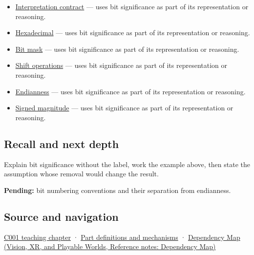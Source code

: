 \begin{itemize}
\tightlist
\item
  \hyperref[appendix-f414bd4ed05c]{Interpretation contract} --- uses bit significance as part of its representation or reasoning.
\item
  \hyperref[appendix-6b8075763724]{Hexadecimal} --- uses bit significance as part of its representation or reasoning.
\item
  \hyperref[appendix-dbe5905163c2]{Bit mask} --- uses bit significance as part of its representation or reasoning.
\item
  \hyperref[appendix-73425b25118e]{Shift operations} --- uses bit significance as part of its representation or reasoning.
\item
  \hyperref[appendix-bc07c3d25b18]{Endianness} --- uses bit significance as part of its representation or reasoning.
\item
  \hyperref[appendix-ce20506c8532]{Signed magnitude} --- uses bit significance as part of its representation or reasoning.
\end{itemize}

\subsection{Recall and next depth}\label{appendix-280445746493-recall-and-next-depth}

\hypertarget{appendix-280445746493-recall-and-next-depth}{}

Explain bit significance without the label, work the example above, then state the assumption whose removal would change the result.

\textbf{Pending:} bit numbering conventions and their separation from endianness.

\subsection{Source and navigation}\label{appendix-280445746493-source-and-navigation}

\hypertarget{appendix-280445746493-source-and-navigation}{}

\hyperref[01-foundations-i-ch001-from-a-signal-to-an-interpretation]{C001 teaching chapter} · \hyperref[appendix-fd090d982a15]{Part definitions and mechanisms} · \href{../07-Vision-XR-and-Playable-Worlds/main.pdf\#nameddest=appendix-4ad47bdd269a}{Dependency Map (Vision, XR, and Playable Worlds, Reference notes: Dependency Map)}
